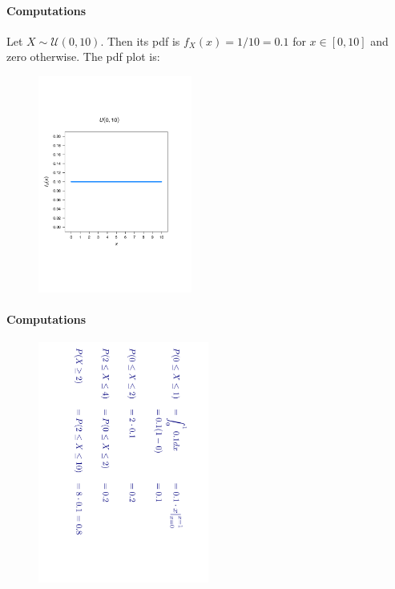 \documentclass[notes=show,smaller,handout]{beamer}\usepackage[]{graphicx}\usepackage[]{color}
\begin{document}
\begin{frame}{\subsecname}
  \framesubtitle{Computations}
  \begin{example}
  Let $X \sim \mathcal{U}(0,10)$. Then its pdf is $f_X(x) = 1/10=0.1$ for $x\in[0,10]$ and zero otherwise. The pdf plot is:

  \begin{figure}[ptb]\centering
  \includegraphics[width=0.45\textwidth,height=0.65\textheight]{img/Unif_Diego.pdf}%
  \end{figure}

  \end{example}
\end{frame}

\begin{frame}{\subsecname}
  \framesubtitle{Computations}

  \begin{example}[continued]


  \begin{figure}[ptb]\centering
  \includegraphics[width=0.5\textwidth,height=0.9\textheight, angle= 90]{img/Unif_Diego_Calc.pdf}%
  \end{figure}
  \end{example}
\end{frame}
\end{document}
